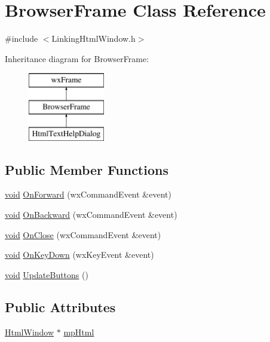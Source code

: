 \hypertarget{class_browser_frame}{}\section{Browser\+Frame Class Reference}
\label{class_browser_frame}


{\ttfamily \#include $<$Linking\+Html\+Window.\+h$>$}

Inheritance diagram for Browser\+Frame\+:\begin{figure}[H]
\begin{center}
\leavevmode
\includegraphics[height=3.000000cm]{class_browser_frame}
\end{center}
\end{figure}
\subsection*{Public Member Functions}
\begin{DoxyCompactItemize}
\item 
\hyperlink{sound_8c_ae35f5844602719cf66324f4de2a658b3}{void} \hyperlink{class_browser_frame_a777d9a3830a36c23b26df5f8c27db338}{On\+Forward} (wx\+Command\+Event \&event)
\item 
\hyperlink{sound_8c_ae35f5844602719cf66324f4de2a658b3}{void} \hyperlink{class_browser_frame_ac3235383613b1cb2f2b94564f7bef175}{On\+Backward} (wx\+Command\+Event \&event)
\item 
\hyperlink{sound_8c_ae35f5844602719cf66324f4de2a658b3}{void} \hyperlink{class_browser_frame_a92d2f0dfaf688f385f19e2f815976725}{On\+Close} (wx\+Command\+Event \&event)
\item 
\hyperlink{sound_8c_ae35f5844602719cf66324f4de2a658b3}{void} \hyperlink{class_browser_frame_a54d6bac1c955774098cca71f7e925dce}{On\+Key\+Down} (wx\+Key\+Event \&event)
\item 
\hyperlink{sound_8c_ae35f5844602719cf66324f4de2a658b3}{void} \hyperlink{class_browser_frame_a10b0323557a47356cf939c936f709c13}{Update\+Buttons} ()
\end{DoxyCompactItemize}
\subsection*{Public Attributes}
\begin{DoxyCompactItemize}
\item 
\hyperlink{class_html_window}{Html\+Window} $\ast$ \hyperlink{class_browser_frame_a0abcac90e4463fd5657541cbeef71ae2}{mp\+Html}
\end{DoxyCompactItemize}


